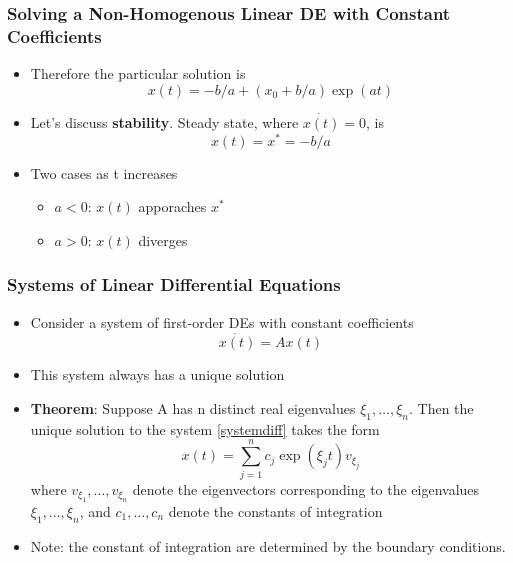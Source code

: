 \documentclass[11pt]{beamer}
\begin{document}
\begin{frame}
\frametitle{Solving a Non-Homogenous Linear DE with Constant Coefficients}
\begin{itemize}\itemsep2ex
	\item Therefore the particular solution is
	\begin{equation*}
	x(t) = -b/a + (x_0 + b/a) \exp(a t)
	\end{equation*}
	\item Let's discuss \textbf{stability}. Steady state, where $\dot{x(t)}=0$, is
	\begin{equation*}
	x(t) = x^* = - b/a
	\end{equation*}
	\item Two cases as t increases
	\begin{itemize}\itemsep2ex
		\item $a<0$: $x(t)$ apporaches $x^*$
		\item $a>0$: $x(t)$ diverges
	\end{itemize}
\end{itemize}
\end{frame}


\begin{frame}
\frametitle{Systems of Linear Differential Equations}
\begin{itemize}\itemsep2ex
	\item Consider a system of first-order DEs with constant coefficients
	\begin{equation}
	\label{systemdiff}
	\dot{x(t)} = A x(t)
	\end{equation}
	\item This system always has a unique solution
	\item \textbf{Theorem}: Suppose A has n distinct real eigenvalues $\xi_1, \dots, \xi_n$. Then the unique solution to the system \eqref{systemdiff} takes the form
	\begin{equation*}
	x(t) = \sum_{j=1}^n c_j \exp(\xi_j t) v_{\xi_j}
	\end{equation*}
	 where $v_{\xi_1}, \dots, v_{\xi_n}$ denote the eigenvectors corresponding to the
	 eigenvalues $\xi_1, \dots, \xi_n$, and $c_1, \dots, c_n$ denote the constants of integration
	\item Note: the constant of integration are determined by the boundary conditions.
\end{itemize}
\end{frame}
\end{document}
